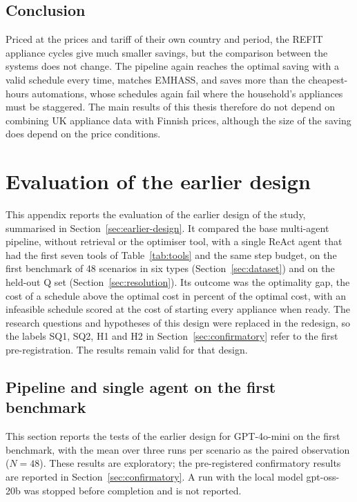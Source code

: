 \section{Conclusion}

Priced at the prices and tariff of their own country and period, the
REFIT appliance cycles give much smaller savings, but the comparison
between the systems does not change. The pipeline again reaches the
optimal saving with a valid schedule every time, matches EMHASS, and
saves more than the cheapest-hours automations, whose schedules again
fail where the household's appliances must be staggered. The main
results of this thesis therefore do not depend on combining UK
appliance data with Finnish prices, although the size of the saving
does depend on the price conditions.


\chapter{Evaluation of the earlier design}
\label{app:earlier}

This appendix reports the evaluation of the earlier design of the study,
summarised in Section~\ref{sec:earlier-design}. It compared the base
multi-agent pipeline, without retrieval or the optimiser tool, with a
single ReAct agent that had the first seven tools of
Table~\ref{tab:tools} and the same step budget, on the first benchmark of
48 scenarios in six types (Section~\ref{sec:dataset}) and on the
held-out Q set (Section~\ref{sec:resolution}). Its outcome was the
optimality gap, the cost of a schedule above the optimal cost in percent
of the optimal cost, with an infeasible schedule scored at the cost of
starting every appliance when ready. The research questions and
hypotheses of this design were replaced in the redesign, so the labels
SQ1, SQ2, H1 and H2 in Section~\ref{sec:confirmatory} refer to the first
pre-registration. The results remain valid for that design.

\section{Pipeline and single agent on the first benchmark}
\label{sec:statistics}

This section reports the tests of the earlier design for GPT-4o-mini on
the first benchmark, with the mean over three runs per scenario as the
paired observation ($N = 48$). These results are exploratory; the
pre-registered confirmatory results are reported in
Section~\ref{sec:confirmatory}. A run with the local model gpt-oss-20b
was stopped before completion and is not reported.

